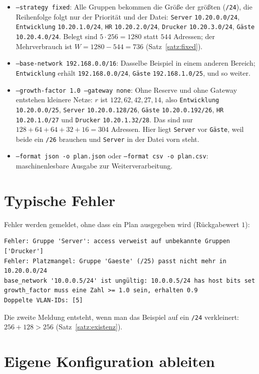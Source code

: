\documentclass[a4paper,12pt, twoside]{report}
\theoremstyle{definition}
\begin{document}
\begin{itemize}
	\item \texttt{--strategy fixed}: Alle Gruppen bekommen die Größe der größten (\texttt{/24}), die Reihenfolge folgt nur der Priorität und der Datei: \texttt{Server} \texttt{10.20.0.0/24}, \texttt{Entwicklung} \texttt{10.20.1.0/24}, \texttt{HR} \texttt{10.20.2.0/24}, \texttt{Drucker} \texttt{10.20.3.0/24}, \texttt{Gäste} \texttt{10.20.4.0/24}. Belegt sind $5\cdot256 = 1280$ statt $544$ Adressen; der Mehrverbrauch ist $W = 1280 - 544 = 736$ (Satz~\ref{satz:fixed}).
	\item \texttt{--base-network 192.168.0.0/16}: Dasselbe Beispiel in einem anderen Bereich; \texttt{Entwicklung} erhält \texttt{192.168.0.0/24}, \texttt{Gäste} \texttt{192.168.1.0/25}, und so weiter.
	\item \texttt{--growth-factor 1.0 --gateway none}: Ohne Reserve und ohne Gateway entstehen kleinere Netze: $r$ ist $122, 62, 42, 27, 14$, also \texttt{Entwicklung} \texttt{10.20.0.0/25}, \texttt{Server} \texttt{10.20.0.128/26}, \texttt{Gäste} \texttt{10.20.0.192/26}, \texttt{HR} \texttt{10.20.1.0/27} und \texttt{Drucker} \texttt{10.20.1.32/28}. Das sind nur $128+64+64+32+16 = 304$ Adressen. Hier liegt \texttt{Server} vor \texttt{Gäste}, weil beide ein \texttt{/26} brauchen und \texttt{Server} in der Datei vorn steht.
	\item \texttt{--format json -o plan.json} oder \texttt{--format csv -o plan.csv}: maschinenlesbare Ausgabe zur Weiterverarbeitung.
\end{itemize}

\section{Typische Fehler}

Fehler werden gemeldet, ohne dass ein Plan ausgegeben wird (Rückgabewert $1$):
\begin{lstlisting}[language={}, numbers=none, basicstyle=\ttfamily\scriptsize]
Fehler: Gruppe 'Server': access verweist auf unbekannte Gruppen ['Drucker']
Fehler: Platzmangel: Gruppe 'Gaeste' (/25) passt nicht mehr in 10.20.0.0/24
base_network '10.0.0.5/24' ist ungültig: 10.0.0.5/24 has host bits set
growth_factor muss eine Zahl >= 1.0 sein, erhalten 0.9
Doppelte VLAN-IDs: [5]
\end{lstlisting}
Die zweite Meldung entsteht, wenn man das Beispiel auf ein \texttt{/24} verkleinert: $256 + 128 > 256$ (Satz~\ref{satz:existenz}).

\section{Eigene Konfiguration ableiten}
\end{document}
